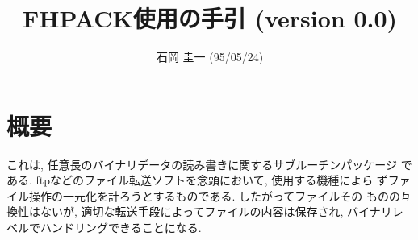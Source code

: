 %
%

\title{FHPACK使用の手引 (version 0.0)}
\author{石岡 圭一  (95/05/24)}
\date{}



\maketitle

\section{概要}

これは, 任意長のバイナリデータの読み書きに関するサブルーチンパッケージ
である. ftpなどのファイル転送ソフトを念頭において, 使用する機種によら
ずファイル操作の一元化を計ろうとするものである. したがってファイルその
ものの互換性はないが, 適切な転送手段によってファイルの内容は保存され, 
バイナリレベルでハンドリングできることになる. 


